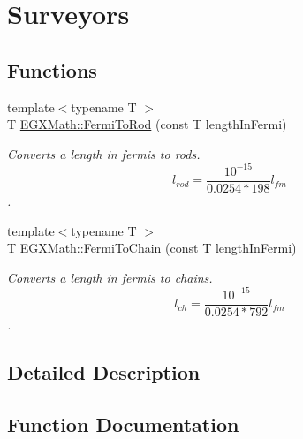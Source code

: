 \hypertarget{group___e_g_x_math-_conversions-_length_conversions-_non-_s_i-_fermi-_surveyors}{}\section{Surveyors}
\label{group___e_g_x_math-_conversions-_length_conversions-_non-_s_i-_fermi-_surveyors}
\subsection*{Functions}
\begin{DoxyCompactItemize}
\item 
{\footnotesize template$<$typename T $>$ }\\T \mbox{\hyperlink{group___e_g_x_math-_conversions-_length_conversions-_non-_s_i-_fermi-_surveyors_ga45d5bb796dd61d3b2f81d45dafbc682d}{E\+G\+X\+Math\+::\+Fermi\+To\+Rod}} (const T length\+In\+Fermi)
\begin{DoxyCompactList}\small\item\em Converts a length in fermis to rods. \[ l_{rod}= \frac{10^{-15}}{0.0254 * 198} l_{fm} \]. \end{DoxyCompactList}\item 
{\footnotesize template$<$typename T $>$ }\\T \mbox{\hyperlink{group___e_g_x_math-_conversions-_length_conversions-_non-_s_i-_fermi-_surveyors_ga0c8f626fae443871df52f72a4b361a60}{E\+G\+X\+Math\+::\+Fermi\+To\+Chain}} (const T length\+In\+Fermi)
\begin{DoxyCompactList}\small\item\em Converts a length in fermis to chains. \[ l_{ch}= \frac{10^{-15}}{0.0254 * 792} l_{fm} \]. \end{DoxyCompactList}\end{DoxyCompactItemize}


\subsection{Detailed Description}


\subsection{Function Documentation}
\mbox{\label{group___e_g_x_math-_conversions-_length_conversions-_non-_s_i-_fermi-_surveyors_ga0c8f626fae443871df52f72a4b361a60}} 
